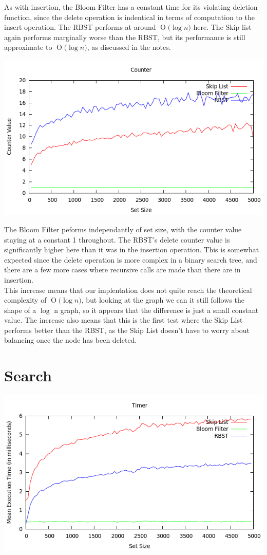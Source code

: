 \documentclass[11pt, notitlepage]{report}
\newcommand{\BigO}[1]{\ensuremath{\operatorname{O}\bigl(#1\bigr)}}
\begin{document}
As with insertion, the Bloom Filter has a constant time for its violating deletion function, since the delete operation is indentical in terms of computation to the insert operation. The RBST performs at around \BigO{\log n} here. The Skip list again performs marginally worse than the RBST, but its performance is still approximate to \BigO{\log n}, as discussed in the notes.

\includegraphics[width=\linewidth]{img/Counter-Del}

The Bloom Filter peforms independantly of set size, with the counter value staying at a constant 1 throughout. The RBST's delete counter value is significantly higher here than it was in the insertion operation. This is somewhat expected since the delete operation is more complex in a binary search tree, and there are a few more cases where recursive calls are made than there are in insertion.\\

This increase means that our implentation does not quite reach the theoretical complexity of \BigO{\log n}, but looking at the graph we can it still follows the shape of a $\log$ n graph, so it appears that the difference is just a small constant value. The increase also means that this is the first test where the Skip List performs better than the RBST, as the Skip List doesn't have to worry about balancing once the node has been deleted.\\

\section*{Search}

\includegraphics[width=\linewidth]{img/Timer-Find}
\end{document}
